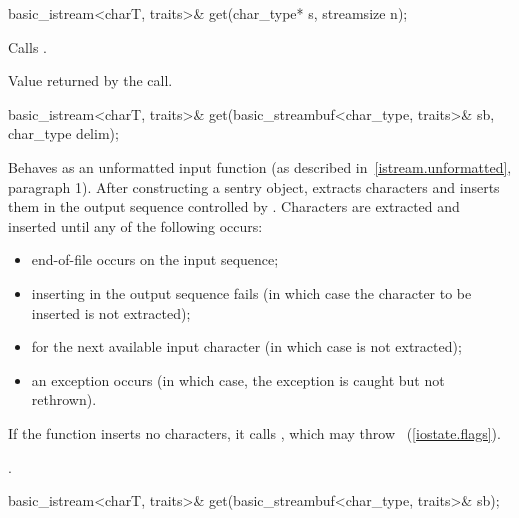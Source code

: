 %
%
\begin{itemdecl}
basic_istream<charT, traits>& get(char_type* s, streamsize n);
\end{itemdecl}

\begin{itemdescr}
\pnum
\effects
Calls
.

\pnum
\returns
Value returned by the call.
\end{itemdescr}

%
%
\begin{itemdecl}
basic_istream<charT, traits>& get(basic_streambuf<char_type, traits>& sb,
                                  char_type delim);
\end{itemdecl}

\begin{itemdescr}
\pnum
\effects
Behaves as an unformatted input function
(as described in~\ref{istream.unformatted}, paragraph 1).
After constructing a sentry object, extracts
characters and inserts them
in the output sequence controlled by
.
Characters are extracted and inserted until any of the following occurs:
\begin{itemize}
\item
end-of-file occurs on the input sequence;
\item
inserting in the output sequence fails
(in which case the character to be inserted is not extracted);
\item
{} for the next available input
character 
(in which case  is not extracted);
\item
an exception occurs
(in which case, the exception is caught but not rethrown).
\end{itemize}

\pnum
If the function inserts no characters, it calls
,
which may throw
~(\ref{iostate.flags}).

\pnum
\returns
{}.
\end{itemdescr}

%
%
\begin{itemdecl}
basic_istream<charT, traits>& get(basic_streambuf<char_type, traits>& sb);
\end{itemdecl}

